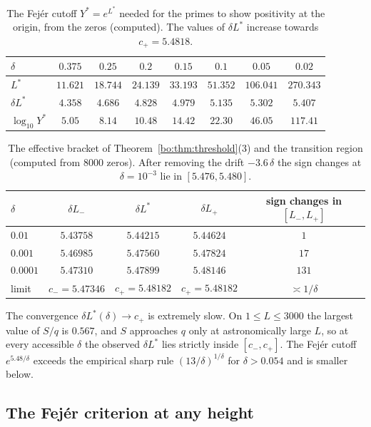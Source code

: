 \begin{table}[ht]
\centering\small
\begin{tabular}{@{}lccccccc@{}}
\toprule
$\delta$ & $0.375$ & $0.25$ & $0.2$ & $0.15$ & $0.1$ & $0.05$ & $0.02$\\
\midrule
$L^*$ & $11.621$ & $18.744$ & $24.139$ & $33.193$ & $51.352$ & $106.041$ & $270.343$\\
$\delta L^*$ & $4.358$ & $4.686$ & $4.828$ & $4.979$ & $5.135$ & $5.302$ & $5.407$\\
$\log_{10}Y^*$ & $5.05$ & $8.14$ & $10.48$ & $14.42$ & $22.30$ & $46.05$ & $117.41$\\
\bottomrule
\end{tabular}
\caption{The Fej\'er cutoff $Y^*=e^{L^*}$ needed for the primes to show positivity at the origin, from the zeros (computed). The values of $\delta L^*$ increase towards $c_+=5.4818$.}
\label{bo:tab:cesaro}
\end{table}

\begin{table}[ht]
\centering\small
\begin{tabular}{@{}lcccc@{}}
\toprule
$\delta$ & $\delta L_-$ & $\delta L^*$ & $\delta L_+$ & sign changes in $[L_-,L_+]$\\
\midrule
$0.01$ & $5.43758$ & $5.44215$ & $5.44624$ & $1$\\
$0.001$ & $5.46985$ & $5.47560$ & $5.47824$ & $17$\\
$0.0001$ & $5.47310$ & $5.47899$ & $5.48146$ & $131$\\
limit & $c_-=5.47346$ & $c_+=5.48182$ & $c_+=5.48182$ & $\asymp1/\delta$\\
\bottomrule
\end{tabular}
\caption{The effective bracket of Theorem~\ref{bo:thm:threshold}(3) and the transition region (computed from $8000$ zeros). After removing the drift $-3.6\,\delta$ the sign changes at $\delta=10^{-3}$ lie in $[5.476,5.480]$.}
\label{bo:tab:transition}
\end{table}

The convergence $\delta L^*(\delta)\to c_+$ is extremely slow. On $1\le L\le3000$ the largest value of $S/q$ is $0.567$, and $S$ approaches $q$ only at astronomically large $L$, so at every accessible $\delta$ the observed $\delta L^*$ lies strictly inside $[c_-,c_+]$. The Fej\'er cutoff $e^{5.48/\delta}$ exceeds the empirical sharp rule $(13/\delta)^{1/\delta}$ for $\delta>0.054$ and is smaller below.

\subsection{The Fej\'er criterion at any height}\label{bo:sec:fejer}

